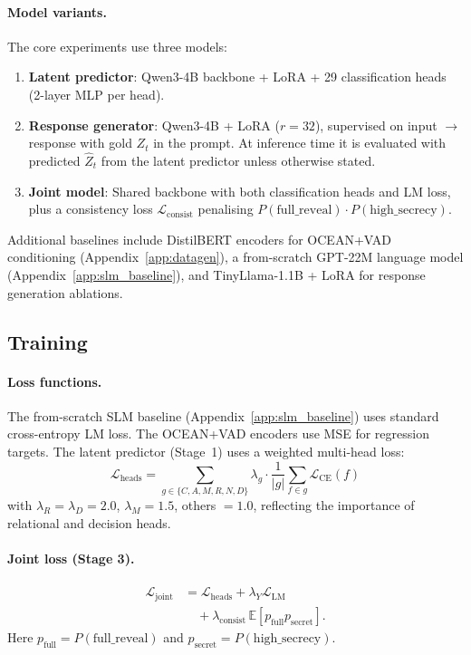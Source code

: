 \documentclass[11pt]{article}
\begin{document}
\paragraph{Model variants.}
The core experiments use three models:
\begin{enumerate}
    \item \textbf{Latent predictor}: Qwen3-4B backbone + LoRA + 29 classification heads (2-layer MLP per head).
    \item \textbf{Response generator}: Qwen3-4B + LoRA ($r=32$), supervised on input $\to$ response with gold $Z_t$ in the prompt. At inference time it is evaluated with predicted $\hat{Z}_t$ from the latent predictor unless otherwise stated.
    \item \textbf{Joint model}: Shared backbone with both classification heads and LM loss, plus a consistency loss $\mathcal{L}_\text{consist}$ penalising $P(\text{full\_reveal}) \cdot P(\text{high\_secrecy})$.
\end{enumerate}

Additional baselines include DistilBERT encoders for OCEAN+VAD conditioning (Appendix~\ref{app:datagen}), a from-scratch GPT-22M language model (Appendix~\ref{app:slm_baseline}), and TinyLlama-1.1B + LoRA for response generation ablations.

\subsection{Training}
\label{sec:training}

\paragraph{Loss functions.}
The from-scratch SLM baseline (Appendix~\ref{app:slm_baseline}) uses standard cross-entropy LM loss.
The OCEAN+VAD encoders use MSE for regression targets.
The latent predictor (Stage~1) uses a weighted multi-head loss:
\begin{equation}
    \mathcal{L}_\text{heads} = \sum_{g \in \{C,A,M,R,N,D\}} \lambda_g \cdot \frac{1}{|g|} \sum_{f \in g} \mathcal{L}_\text{CE}(f)
\end{equation}
with $\lambda_R = \lambda_D = 2.0$, $\lambda_M = 1.5$, others $= 1.0$, reflecting the importance of relational and decision heads.

\paragraph{Joint loss (Stage 3).}
\label{sec:joint}
\begin{equation}
    \begin{aligned}
    \mathcal{L}_\text{joint}
    &= \mathcal{L}_\text{heads} + \lambda_Y \mathcal{L}_\text{LM} \\
    &\quad + \lambda_\text{consist}\,\mathbb{E}[p_\text{full}p_\text{secret}].
    \end{aligned}
\end{equation}
Here $p_\text{full}=P(\text{full\_reveal})$ and $p_\text{secret}=P(\text{high\_secrecy})$.
\end{document}
